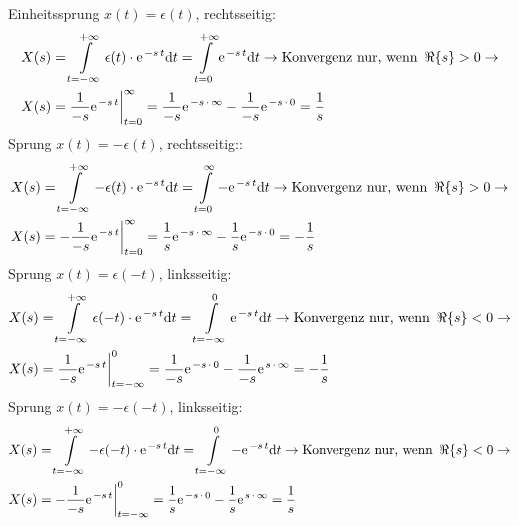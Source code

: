 \documentclass[11pt,a4paper,DIV=12]{scrartcl}
\numberwithin{equation}{section}
\numberwithin{figure}{section}
\newcommand\fsd{\mathrm{d}} %
\begin{document}
\begin{ExCalc}
Einheitssprung $x(t)=\epsilon(t)$, rechtsseitig:
\begin{align}
  &X(s) = \int\limits_{t=-\infty}^{+\infty} \epsilon(t) \cdot \e^{-s\,t} \fsd t
  = \int\limits_{t=0}^{+\infty} \e^{-s\,t} \fsd t
  \rightarrow \text{Konvergenz nur, wenn}\,\,\,\Re\{s\}>0
  \rightarrow\\
  &X(s) = \frac{1}{-s}\e^{-s\,t}\bigg|_{t=0}^{\infty}
  = \frac{1}{-s}\e^{-s \,\cdot\, \infty} - \frac{1}{-s}\e^{-s\,\cdot\, 0} = \frac{1}{s}
\end{align}
%
Sprung $x(t)=-\epsilon(t)$, rechtsseitig::
\begin{align}
  &X(s) = \int\limits_{t=-\infty}^{+\infty} -\epsilon(t) \cdot \e^{-s\,t} \fsd t
  = \int\limits_{t=0}^{\infty} - \e^{-s\,t} \fsd t
  \rightarrow \text{Konvergenz nur, wenn}\,\,\,\Re\{s\}>0
  \rightarrow\\
  &X(s) = -\frac{1}{-s}\e^{-s\,t}\bigg|_{t=0}^{\infty}
  = \frac{1}{s}\e^{-s\,\cdot\, \infty} - \frac{1}{s}\e^{-s\,\cdot\, 0} = -\frac{1}{s}
\end{align}
%
Sprung $x(t)=\epsilon(-t)$, linksseitig:
\begin{align}
  &X(s) = \int\limits_{t=-\infty}^{+\infty} \epsilon(-t) \cdot \e^{-s\,t} \fsd t
  = \int\limits_{t=-\infty}^{0} \e^{-s\,t} \fsd t
  \rightarrow \text{Konvergenz nur, wenn}\,\,\,\Re\{s\}<0
  \rightarrow\\
  &X(s) = \frac{1}{-s}\e^{-s\,t}\bigg|_{t=-\infty}^{0}
  = \frac{1}{-s}\e^{-s\,\cdot\, 0} - \frac{1}{-s}\e^{s\,\cdot\, \infty} = -\frac{1}{s}
\end{align}
%
Sprung $x(t)=-\epsilon(-t)$, linksseitig:
\begin{align}
  &X(s) = \int\limits_{t=-\infty}^{+\infty} -\epsilon(-t) \cdot \e^{-s\,t} \fsd t
  = \int\limits_{t=-\infty}^{0} - \e^{-s\,t} \fsd t
  \rightarrow \text{Konvergenz nur, wenn}\,\,\,\Re\{s\}<0
  \rightarrow\\
  &X(s) = -\frac{1}{-s}\e^{-s\,t}\bigg|_{t=-\infty}^{0}
  = \frac{1}{s}\e^{-s \, \cdot \, 0} - \frac{1}{s}\e^{s \, \cdot \, \infty} = \frac{1}{s}
\end{align}
\end{ExCalc}
\end{document}
